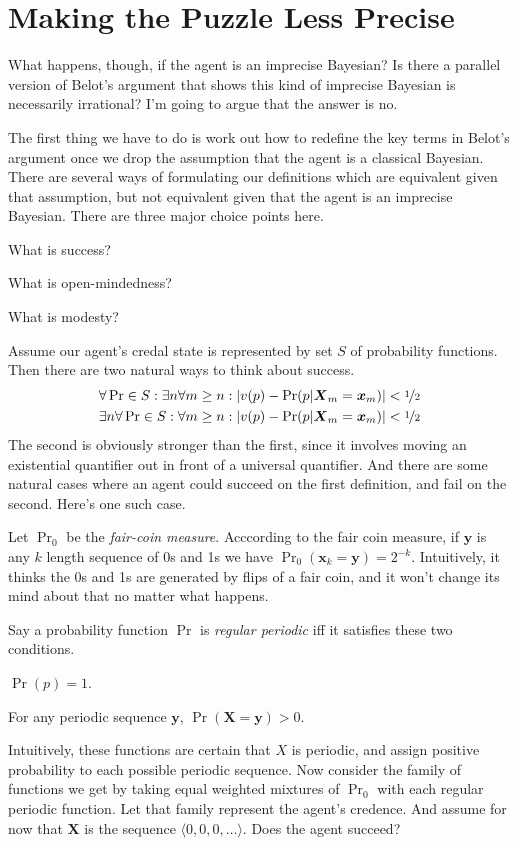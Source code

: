 \documentclass{ergoclass}
\newcommand{\vx}{\boldsymbol{x}}
\newcommand{\vX}{\boldsymbol{X}}
\newcommand{\vy}{\boldsymbol{y}}
\begin{document}
\section{Making the Puzzle Less Precise}

What happens, though, if the agent is an imprecise Bayesian? Is there a parallel version of Belot's argument that shows this kind of imprecise Bayesian is necessarily irrational? I'm going to argue that the answer is no.

The first thing we have to do is work out how to redefine the key terms in Belot's argument once we drop the assumption that the agent is a classical Bayesian. There are several ways of formulating our definitions which are equivalent given that assumption, but not equivalent given that the agent is an imprecise Bayesian. There are three major choice points here.

\begin{enumerate*}
\item What is success?
\item What is open-mindedness?
\item What is modesty?
\end{enumerate*}
Assume our agent's credal state is represented by set $S$ of probability functions. Then there are two natural ways to think about success.
%
\begin{align*}
\forall \Pr \in S:  \exists n \forall m \geq n: |v(p) - \Pr(p | \vX_m= \vx_m)| < \nicefrac{1}{2} \\
\exists n \forall \Pr \in S: \forall m \geq n: |v(p) - \Pr(p | \vX_m= \vx_m)| < \nicefrac{1}{2}
\end{align*}
%
The second is obviously stronger than the first, since it involves moving an existential quantifier out in front of a universal quantifier. And there are some natural cases where an agent could succeed on the first definition, and fail on the second. Here's one such case.

Let $\Pr_0$ be the \textit{fair-coin measure}. Acccording to the fair coin measure, if $\vy$ is  any $k$ length sequence of 0s and 1s we have $\Pr_0(\vx_k = \vy) = 2^{-k}$. Intuitively, it thinks the 0s and 1s are generated by flips of a fair coin, and it won't change its mind about that no matter what happens.

Say a probability function $\Pr$ is \textit{regular periodic} iff it satisfies these two conditions.
\begin{itemize*}
\item $\Pr(p) = 1$.
\item For any periodic sequence $\vy$, $\Pr(\vX = \vy) > 0$.
\end{itemize*}
%
Intuitively, these functions are certain that $X$ is periodic, and assign positive probability to each possible periodic sequence. Now consider the family of functions we get by taking equal weighted mixtures of $\Pr_0$ with each regular periodic function. Let that family represent the agent's credence. And assume for now that $\vX$ is the sequence $\langle 0, 0, 0, \dots \rangle$. Does the agent succeed?\label{FailureExample}
\end{document}
